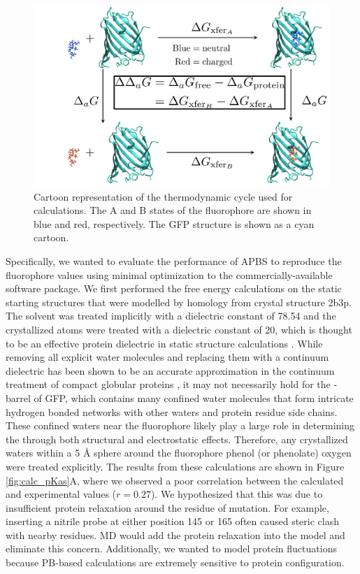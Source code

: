 \begin{figure}
    \center
    \includegraphics[width=\single]{figures-gfp-pKa/thermocycle.png}
    \caption[Schematic of the themodynaic cycle used for \pKa{} calculuations]{
        Cartoon representation of the thermodynamic cycle used for \pKa{} calculations. 
        The A and B states of the fluorophore are shown in blue and red, respectively. 
        The GFP structure is shown as a cyan cartoon.
    }
    \label{fig:thermocycle}
\end{figure}

Specifically, we wanted to evaluate the performance of APBS to reproduce the fluorophore \pKa{} values using minimal optimization to the commercially-available software package. 
We first performed the free energy calculations on the static starting structures that were modelled by homology from crystal structure 2b3p. 
The solvent was treated implicitly with a dielectric constant of 78.54 and the crystallized atoms were treated with a dielectric constant of 20, which is thought to be an effective protein dielectric in static structure calculations \cite{Mehler1999}.
While removing all explicit water molecules and replacing them with a continuum dielectric has been shown to be an accurate approximation in the continuum treatment of compact globular proteins \cite{Kukic2013, Simonson1996}, it may not necessarily hold for the \textbeta{}-barrel of GFP, which contains many confined water molecules that form intricate hydrogen bonded networks with other waters and protein residue side chains. These confined waters near the fluorophore likely play a large role in determining the \pKa{} through both structural and electrostatic effects.
Therefore, any crystallized waters within a 5 \si{\angstrom} sphere around the fluorophore phenol (or phenolate) oxygen were treated explicitly.
The results from these calculations are shown in Figure \ref{fig:calc_pKas}A, where we observed a poor correlation between the calculated and experimental \pKa{} values ($r = 0.27$).
We hypothesized that this was due to insufficient protein relaxation around the residue of mutation.
For example, inserting a nitrile probe at either position 145 or 165 often caused steric clash with nearby residues.
MD would add the protein relaxation into the model and eliminate this concern.
Additionally, we wanted to model protein fluctuations because PB-based calculations are extremely sensitive to protein configuration.


